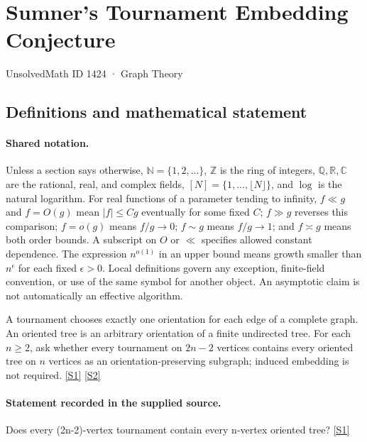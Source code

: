 \documentclass[11pt,a4paper]{article}
\newcommand{\N}{\mathbb{N}}
\newcommand{\Z}{\mathbb{Z}}
\newcommand{\Q}{\mathbb{Q}}
\newcommand{\R}{\mathbb{R}}
\newcommand{\C}{\mathbb{C}}
\newcommand{\sref}[2]{\hyperlink{source:#1:#2}{[S#2]}}
\begin{document}

\setcounter{section}{1423}

\section{Sumner’s Tournament Embedding Conjecture}\label{1424}

{\small\sffamily UnsolvedMath ID 1424 · Graph Theory}

\subsection{Definitions and mathematical statement}

\paragraph{Shared notation.}Unless a section says otherwise, $\N=\{1,2,\ldots\}$,
$\Z$ is the ring of integers, $\Q,\R,\C$ are the rational, real, and complex
fields, $[N]=\{1,\ldots,\lfloor N\rfloor\}$, and $\log$ is the natural
logarithm. For real functions of a parameter tending to infinity,
$f\ll g$ and $f=O(g)$ mean $|f|\leq Cg$ eventually for some fixed $C$;
$f\gg g$ reverses this comparison; $f=o(g)$ means $f/g\to0$;
$f\sim g$ means $f/g\to1$; and $f\asymp g$ means both order bounds.
A subscript on $O$ or $\ll$ specifies allowed constant dependence.
The expression $n^{o(1)}$ in an upper bound means growth smaller than
$n^\epsilon$ for each fixed $\epsilon>0$. Local definitions govern any
exception, finite-field convention, or use of the same symbol for another
object. An asymptotic claim is not automatically an effective algorithm.



A tournament chooses exactly one orientation for each edge of a complete graph. An oriented tree is an arbitrary orientation of a finite undirected tree. For each $n\geq2$, ask whether every tournament on $2n-2$ vertices contains every oriented tree on $n$ vertices as an orientation-preserving subgraph; induced embedding is not required. \sref{1424}{1} \sref{1424}{2}

\paragraph{Statement recorded in the supplied source.}
Does every (2n-2)-vertex tournament contain every n-vertex oriented tree? \sref{1424}{1}
\end{document}

